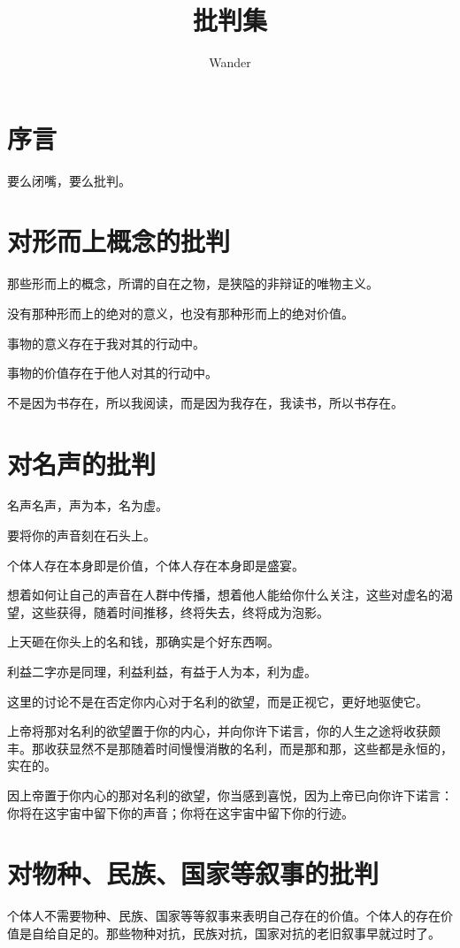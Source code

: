 \documentclass[12pt,oneside]{book}
\title{批判集}
\author{Wander}
\begin{document}
\makemytitleA
{}

\frontmatter 
{}
\chapter*{序言}
要么闭嘴，要么批判。

\setcounter{tocdepth}{2}    
\tableofcontents


\mainmatter


\chapter{对形而上概念的批判}
那些形而上的概念，所谓的自在之物，是狭隘的非辩证的唯物主义。

没有那种形而上的绝对的意义，也没有那种形而上的绝对价值。

事物的意义存在于我对其的行动中。

事物的价值存在于他人对其的行动中。

不是因为书存在，所以我阅读，而是因为我存在，我读书，所以书存在。




\chapter{对名声的批判}
名声名声，声为本，名为虚。

要将你的声音刻在石头上。

个体人存在本身即是价值，个体人存在本身即是盛宴。

想着如何让自己的声音在人群中传播，想着他人能给你什么关注，这些对虚名的渴望，这些获得，随着时间推移，终将失去，终将成为泡影。

上天砸在你头上的名和钱，那确实是个好东西啊。

利益二字亦是同理，利益利益，有益于人为本，利为虚。

这里的讨论不是在否定你内心对于名利的欲望，而是正视它，更好地驱使它。

上帝将那对名利的欲望置于你的内心，并向你许下诺言，你的人生之途将收获颇丰。那收获显然不是那随着时间慢慢消散的名利，而是那和那，这些都是永恒的，实在的。

因上帝置于你内心的那对名利的欲望，你当感到喜悦，因为上帝已向你许下诺言：你将在这宇宙中留下你的声音；你将在这宇宙中留下你的行迹。

\chapter{对物种、民族、国家等叙事的批判}
个体人不需要物种、民族、国家等等叙事来表明自己存在的价值。个体人的存在价值是自给自足的。那些物种对抗，民族对抗，国家对抗的老旧叙事早就过时了。
\end{document}
